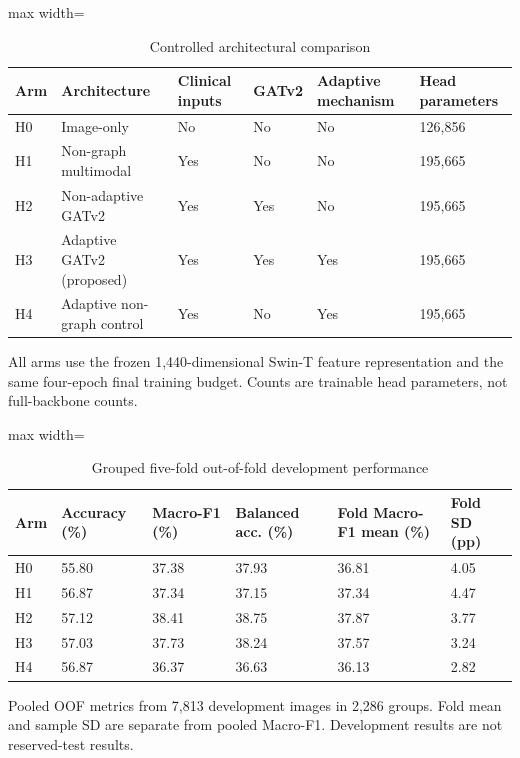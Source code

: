 \begin{table}[t]
\centering
\small
\caption{Controlled architectural comparison}
\label{tab:03-ablation-design}
\begin{adjustbox}{max width=\textwidth}
\begin{tabular}{llllll}
\toprule
\textbf{Arm} & \textbf{Architecture} & \textbf{Clinical inputs} & \textbf{GATv2} & \textbf{Adaptive mechanism} & \textbf{Head parameters} \\
\midrule
H0 & Image-only & No & No & No & 126,856 \\
H1 & Non-graph multimodal & Yes & No & No & 195,665 \\
H2 & Non-adaptive GATv2 & Yes & Yes & No & 195,665 \\
H3 & Adaptive GATv2 (proposed) & Yes & Yes & Yes & 195,665 \\
H4 & Adaptive non-graph control & Yes & No & Yes & 195,665 \\
\bottomrule
\end{tabular}
\end{adjustbox}
\par\smallskip
\begin{minipage}{\textwidth}\footnotesize All arms use the frozen 1,440-dimensional Swin-T feature representation and the same four-epoch final training budget. Counts are trainable head parameters, not full-backbone counts.\end{minipage}
\end{table}

\begin{table}[t]
\centering
\small
\caption{Grouped five-fold out-of-fold development performance}
\label{tab:04-development-oof}
\begin{adjustbox}{max width=\textwidth}
\begin{tabular}{llllll}
\toprule
\textbf{Arm} & \textbf{Accuracy (\%)} & \textbf{Macro-F1 (\%)} & \textbf{Balanced acc. (\%)} & \textbf{Fold Macro-F1 mean (\%)} & \textbf{Fold SD (pp)} \\
\midrule
H0 & 55.80 & 37.38 & 37.93 & 36.81 & 4.05 \\
H1 & 56.87 & 37.34 & 37.15 & 37.34 & 4.47 \\
H2 & 57.12 & 38.41 & 38.75 & 37.87 & 3.77 \\
H3 & 57.03 & 37.73 & 38.24 & 37.57 & 3.24 \\
H4 & 56.87 & 36.37 & 36.63 & 36.13 & 2.82 \\
\bottomrule
\end{tabular}
\end{adjustbox}
\par\smallskip
\begin{minipage}{\textwidth}\footnotesize Pooled OOF metrics from 7,813 development images in 2,286 groups. Fold mean and sample SD are separate from pooled Macro-F1. Development results are not reserved-test results.\end{minipage}
\end{table}


